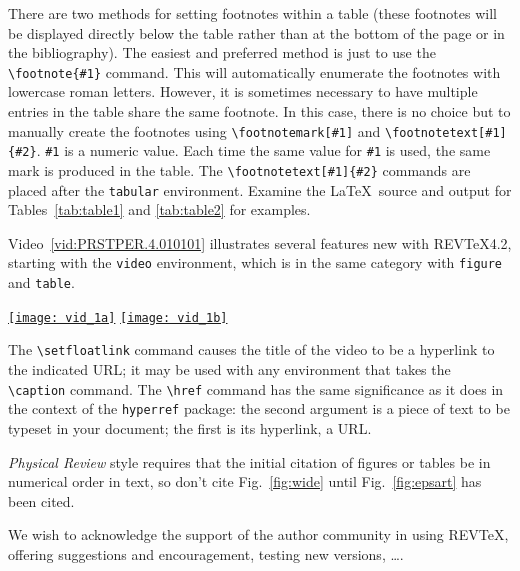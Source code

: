 \documentclass[%
 reprint,
 amsmath,amssymb,
 aps,
]{revtex4-2}
\begin{document}
There are two methods for setting footnotes within a table (these
footnotes will be displayed directly below the table rather than at
the bottom of the page or in the bibliography). The easiest
and preferred method is just to use the \verb+\footnote{#1}+
command. This will automatically enumerate the footnotes with
lowercase roman letters. However, it is sometimes necessary to have
multiple entries in the table share the same footnote. In this case,
there is no choice but to manually create the footnotes using
\verb+\footnotemark[#1]+ and \verb+\footnotetext[#1]{#2}+.
\texttt{\#1} is a numeric value. Each time the same value for
\texttt{\#1} is used, the same mark is produced in the table. The
\verb+\footnotetext[#1]{#2}+ commands are placed after the \texttt{tabular}
environment. Examine the \LaTeX\ source and output for
Tables~\ref{tab:table1} and \ref{tab:table2}
for examples.

Video~\ref{vid:PRSTPER.4.010101} 
illustrates several features new with REV\TeX4.2,
starting with the \texttt{video} environment, which is in the same category with
\texttt{figure} and \texttt{table}.%
\begin{video}
\href{http://prst-per.aps.org/multimedia/PRSTPER/v4/i1/e010101/e010101_vid1a.mpg}{\texttt{[image: vid\_1a]}}%
 \quad
\href{http://prst-per.aps.org/multimedia/PRSTPER/v4/i1/e010101/e010101_vid1b.mpg}{\texttt{[image: vid\_1b]}}
 \caption{\label{vid:PRSTPER.4.010101}%
  Students explain their initial idea about Newton's third law to a teaching assistant. 
  Clip (a): same force.
  Clip (b): move backwards.
 }%
\end{video}
The \verb+\setfloatlink+ command causes the title of the video to be a hyperlink to the
indicated URL; it may be used with any environment that takes the \verb+\caption+
command.
The \verb+\href+ command has the same significance as it does in the context of
the \texttt{hyperref} package: the second argument is a piece of text to be 
typeset in your document; the first is its hyperlink, a URL.

\textit{Physical Review} style requires that the initial citation of
figures or tables be in numerical order in text, so don't cite
Fig.~\ref{fig:wide} until Fig.~\ref{fig:epsart} has been cited.

\begin{acknowledgments}
We wish to acknowledge the support of the author community in using
REV\TeX{}, offering suggestions and encouragement, testing new versions,
\dots.
\end{acknowledgments}
\end{document}
